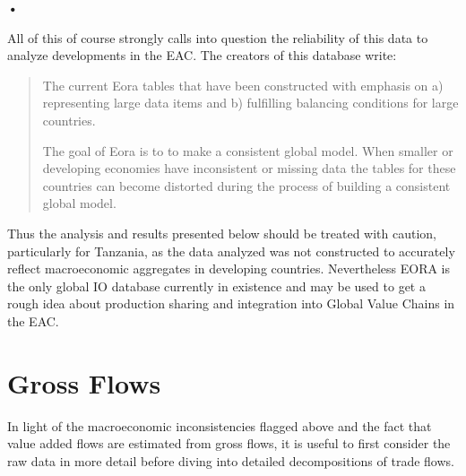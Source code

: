 \textbf{\textbf{•}}\documentclass[a4paper]{article}
\begin{document}
All of this of course strongly calls into question the reliability of this data to analyze developments in the EAC. The creators of this database write:

\begin{quote}
The current Eora tables that have been constructed with emphasis on a) representing large data items and b) fulfilling balancing conditions for large countries.

The goal of Eora is to to make a consistent global model. When smaller or developing economies have inconsistent or missing data the tables for these countries can become distorted during the process of building a consistent global model. %
\end{quote}

Thus the analysis and results presented below should be treated with caution, particularly for Tanzania, as the data analyzed was not constructed to accurately reflect macroeconomic aggregates in developing countries. Nevertheless EORA is the only global IO database currently in existence and may be used to get a rough idea about production sharing and integration into Global Value Chains in the EAC. 

\section{Gross Flows}
In light of the macroeconomic inconsistencies flagged above and the fact that value added flows are estimated from gross flows, it is useful to first consider the raw data in more detail before diving into detailed decompositions of trade flows. 
\end{document}

